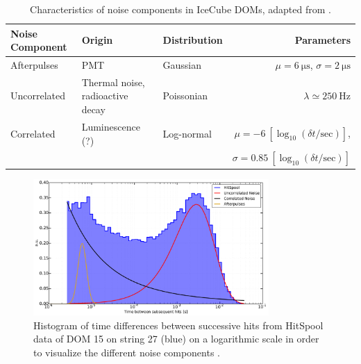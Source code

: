\begin{table}[h!]
\caption{Characteristics of noise components in IceCube DOMs, adapted from \cite{stanisha_noise_14}.}
  \centering
  \footnotesize
\begin{tabularx}{\textwidth}{lXXr}
\toprule
Noise Component& Origin & Distribution & Parameters \\
\midrule
Afterpulses & PMT & Gaussian & $\mu = \SI{6}{\micro\second}$, $\sigma = \SI{2}{\micro\second}$\\
Uncorrelated & Thermal noise, \newline radioactive decay & Poissonian & $\lambda \simeq \SI{250}{\hertz}$\\
Correlated & Luminescence (?) & Log-normal &
$\mu = \num{-6}\ [\log_{10}(\delta t/\mathrm{sec})]$, \\
& & & 
$\sigma = \num{0.85}\ [\log_{10}(\delta t/\mathrm{sec})]$ \\
\bottomrule
\end{tabularx}
\label{tab:noise}
\end{table}

\begin{figure}[!h]
 \centering
  \includegraphics[width=0.8\textwidth]{graphics/dom/performance/darknoise/SingleDOM_HitSpool_Hits_deltaT_fits_example.pdf}
 \caption{Histogram of time differences between successive hits from HitSpool data of
DOM 15 on string 27 (blue) on a logarithmic scale in order to visualize the
different noise components \cite{heereman2015hitspooling}.}
 \label{fig:darknoise_deltaT_components}
\end{figure}

